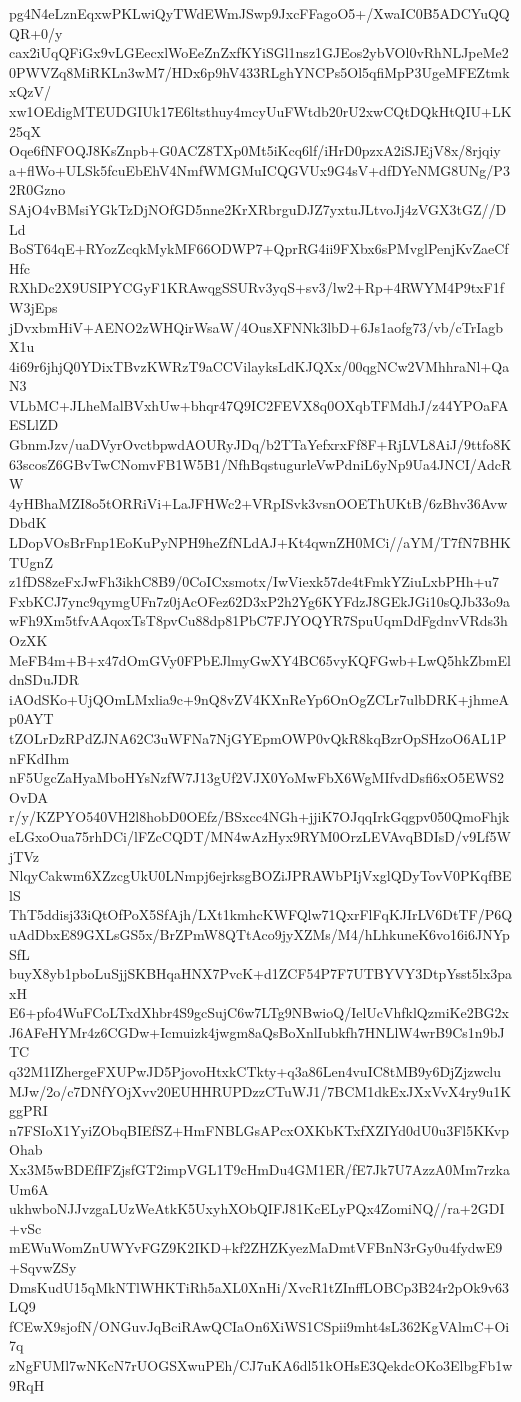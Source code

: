 pg4N4eLznEqxwPKLwiQyTWdEWmJSwp9JxcFFagoO5+/XwaIC0B5ADCYuQQQR+0/y
cax2iUqQFiGx9vLGEecxlWoEeZnZxfKYiSGl1nsz1GJEos2ybVOl0vRhNLJpeMe2
0PWVZq8MiRKLn3wM7/HDx6p9hV433RLghYNCPs5Ol5qfiMpP3UgeMFEZtmkxQzV/
xw1OEdigMTEUDGIUk17E6ltsthuy4mcyUuFWtdb20rU2xwCQtDQkHtQIU+LK25qX
Oqe6fNFOQJ8KsZnpb+G0ACZ8TXp0Mt5iKcq6lf/iHrD0pzxA2iSJEjV8x/8rjqiy
a+flWo+ULSk5fcuEbEhV4NmfWMGMuICQGVUx9G4sV+dfDYeNMG8UNg/P32R0Gzno
SAjO4vBMsiYGkTzDjNOfGD5nne2KrXRbrguDJZ7yxtuJLtvoJj4zVGX3tGZ//DLd
BoST64qE+RYozZcqkMykMF66ODWP7+QprRG4ii9FXbx6sPMvglPenjKvZaeCfHfc
RXhDc2X9USIPYCGyF1KRAwqgSSURv3yqS+sv3/lw2+Rp+4RWYM4P9txF1fW3jEps
jDvxbmHiV+AENO2zWHQirWsaW/4OusXFNNk3lbD+6Js1aofg73/vb/cTrIagbX1u
4i69r6jhjQ0YDixTBvzKWRzT9aCCVilayksLdKJQXx/00qgNCw2VMhhraNl+QaN3
VLbMC+JLheMalBVxhUw+bhqr47Q9IC2FEVX8q0OXqbTFMdhJ/z44YPOaFAESLlZD
GbnmJzv/uaDVyrOvctbpwdAOURyJDq/b2TTaYefxrxFf8F+RjLVL8AiJ/9ttfo8K
63scosZ6GBvTwCNomvFB1W5B1/NfhBqstugurleVwPdniL6yNp9Ua4JNCI/AdcRW
4yHBhaMZI8o5tORRiVi+LaJFHWc2+VRpISvk3vsnOOEThUKtB/6zBhv36AvwDbdK
LDopVOsBrFnp1EoKuPyNPH9heZfNLdAJ+Kt4qwnZH0MCi//aYM/T7fN7BHKTUgnZ
z1fDS8zeFxJwFh3ikhC8B9/0CoICxsmotx/IwViexk57de4tFmkYZiuLxbPHh+u7
FxbKCJ7ync9qymgUFn7z0jAcOFez62D3xP2h2Yg6KYFdzJ8GEkJGi10sQJb33o9a
wFh9Xm5tfvAAqoxTsT8pvCu88dp81PbC7FJYOQYR7SpuUqmDdFgdnvVRds3hOzXK
MeFB4m+B+x47dOmGVy0FPbEJlmyGwXY4BC65vyKQFGwb+LwQ5hkZbmEldnSDuJDR
iAOdSKo+UjQOmLMxlia9c+9nQ8vZV4KXnReYp6OnOgZCLr7ulbDRK+jhmeAp0AYT
tZOLrDzRPdZJNA62C3uWFNa7NjGYEpmOWP0vQkR8kqBzrOpSHzoO6AL1PnFKdIhm
nF5UgcZaHyaMboHYsNzfW7J13gUf2VJX0YoMwFbX6WgMIfvdDsfi6xO5EWS2OvDA
r/y/KZPYO540VH2l8hobD0OEfz/BSxcc4NGh+jjiK7OJqqIrkGqgpv050QmoFhjk
eLGxoOua75rhDCi/lFZcCQDT/MN4wAzHyx9RYM0OrzLEVAvqBDIsD/v9Lf5WjTVz
NlqyCakwm6XZzcgUkU0LNmpj6ejrksgBOZiJPRAWbPIjVxglQDyTovV0PKqfBElS
ThT5ddisj33iQtOfPoX5SfAjh/LXt1kmhcKWFQlw71QxrFlFqKJIrLV6DtTF/P6Q
uAdDbxE89GXLsGS5x/BrZPmW8QTtAco9jyXZMs/M4/hLhkuneK6vo16i6JNYpSfL
buyX8yb1pboLuSjjSKBHqaHNX7PvcK+d1ZCF54P7F7UTBYVY3DtpYsst5lx3paxH
E6+pfo4WuFCoLTxdXhbr4S9gcSujC6w7LTg9NBwioQ/IelUcVhfklQzmiKe2BG2x
J6AFeHYMr4z6CGDw+Icmuizk4jwgm8aQsBoXnlIubkfh7HNLlW4wrB9Cs1n9bJTC
q32M1IZhergeFXUPwJD5PjovoHtxkCTkty+q3a86Len4vuIC8tMB9y6DjZjzwclu
MJw/2o/c7DNfYOjXvv20EUHHRUPDzzCTuWJ1/7BCM1dkExJXxVvX4ry9u1KggPRI
n7FSIoX1YyiZObqBIEfSZ+HmFNBLGsAPcxOXKbKTxfXZIYd0dU0u3Fl5KKvpOhab
Xx3M5wBDEfIFZjsfGT2impVGL1T9cHmDu4GM1ER/fE7Jk7U7AzzA0Mm7rzkaUm6A
ukhwboNJJvzgaLUzWeAtkK5UxyhXObQIFJ81KcELyPQx4ZomiNQ//ra+2GDI+vSc
mEWuWomZnUWYvFGZ9K2IKD+kf2ZHZKyezMaDmtVFBnN3rGy0u4fydwE9+SqvwZSy
DmsKudU15qMkNTlWHKTiRh5aXL0XnHi/XvcR1tZInffLOBCp3B24r2pOk9v63LQ9
fCEwX9sjofN/ONGuvJqBciRAwQCIaOn6XiWS1CSpii9mht4sL362KgVAlmC+Oi7q
zNgFUMl7wNKcN7rUOGSXwuPEh/CJ7uKA6dl51kOHsE3QekdcOKo3ElbgFb1w9RqH
